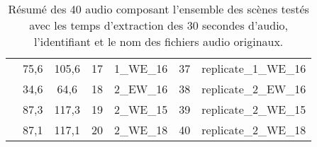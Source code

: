 \begin{table}[ht]
\begin{tabular}{|p{2cm}|c|c||c|c||c|c|}
                                  & 75,6 & 105,6 & 17 & 1\_WE\_16 & 37 & replicate\_1\_WE\_16 \\
                                  & 34,6 & 64,6 & 18 & 2\_EW\_16 & 38 & replicate\_2\_EW\_16 \\
                                  & 87,3 & 117,3 & 19 & 2\_WE\_15 & 39 & replicate\_2\_WE\_15 \\
                                  & 87,1 & 117,1 & 20 & 2\_WE\_18 & 40 & replicate\_2\_WE\_18\\
\hline
\end{tabular}
\caption{Résumé des 40 audio composant l'ensemble des scènes testés avec les temps d'extraction des 30 secondes d'audio, l'identifiant et le nom des fichiers audio originaux.}
\label{tab:resume_scene_test}
\end{table}
